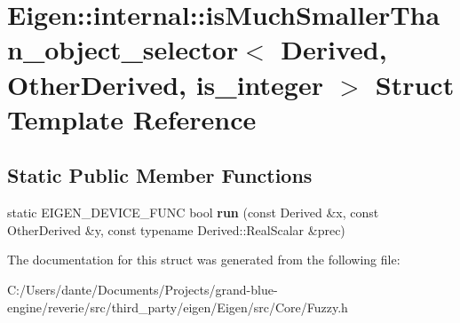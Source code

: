 \hypertarget{struct_eigen_1_1internal_1_1is_much_smaller_than__object__selector}{}\section{Eigen\+::internal\+::is\+Much\+Smaller\+Than\+\_\+object\+\_\+selector$<$ Derived, Other\+Derived, is\+\_\+integer $>$ Struct Template Reference}
\label{struct_eigen_1_1internal_1_1is_much_smaller_than__object__selector}
\subsection*{Static Public Member Functions}
\begin{DoxyCompactItemize}
\item 
\mbox{\label{struct_eigen_1_1internal_1_1is_much_smaller_than__object__selector_a4055eacfe65dad75de1e5cf0740fe7c1}} 
static E\+I\+G\+E\+N\+\_\+\+D\+E\+V\+I\+C\+E\+\_\+\+F\+U\+NC bool {\bfseries run} (const Derived \&x, const Other\+Derived \&y, const typename Derived\+::\+Real\+Scalar \&prec)
\end{DoxyCompactItemize}


The documentation for this struct was generated from the following file\+:\begin{DoxyCompactItemize}
\item 
C\+:/\+Users/dante/\+Documents/\+Projects/grand-\/blue-\/engine/reverie/src/third\+\_\+party/eigen/\+Eigen/src/\+Core/Fuzzy.\+h\end{DoxyCompactItemize}
